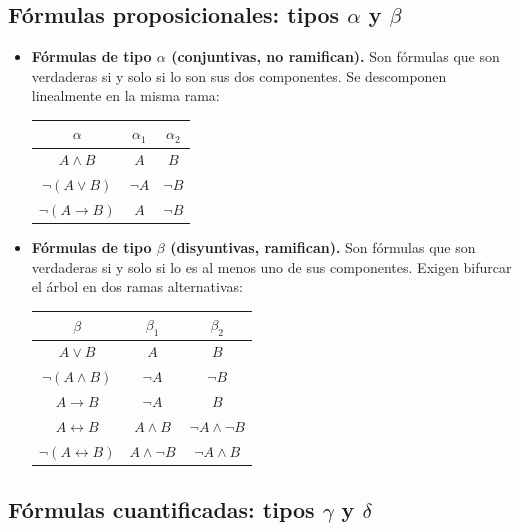 \subsection{Fórmulas proposicionales: tipos \texorpdfstring{$\alpha$}{alpha} y \texorpdfstring{$\beta$}{beta}}

\begin{itemize}
    \item \textbf{Fórmulas de tipo $\alpha$ (conjuntivas, no ramifican).}  
    Son fórmulas que son verdaderas si y solo si lo son sus dos componentes. Se descomponen linealmente en la misma rama:
    \begin{center}
    \begin{tabular}{|c|c|c|}
    \hline
    $\alpha$ & $\alpha_1$ & $\alpha_2$ \\
    \hline
    $A \land B$ & $A$ & $B$ \\
    $\neg (A \lor B)$ & $\neg A$ & $\neg B$ \\
    $\neg (A \to B)$ & $A$ & $\neg B$ \\
    \hline
    \end{tabular}
    \end{center}
    
    \item \textbf{Fórmulas de tipo $\beta$ (disyuntivas, ramifican).}  
    Son fórmulas que son verdaderas si y solo si lo es al menos uno de sus componentes. Exigen bifurcar el árbol en dos ramas alternativas:
    \begin{center}
    \begin{tabular}{|c|c|c|}
    \hline
    $\beta$ & $\beta_1$ & $\beta_2$ \\
    \hline
    $A \lor B$ & $A$ & $B$ \\
    $\neg (A \land B)$ & $\neg A$ & $\neg B$ \\
    $A \to B$ & $\neg A$ & $B$ \\
    $A \leftrightarrow B$ & $A \land B$ & $\neg A \land \neg B$ \\
    $\neg (A \leftrightarrow B)$ & $A \land \neg B$ & $\neg A \land B$ \\
    \hline
    \end{tabular}
    \end{center}
\end{itemize}

\subsection{Fórmulas cuantificadas: tipos \texorpdfstring{$\gamma$}{gamma} y \texorpdfstring{$\delta$}{delta}}


